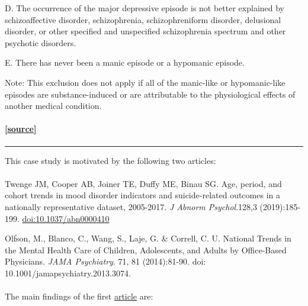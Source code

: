\documentclass[
]{article}
\begin{document}
D. The occurrence of the major depressive episode is not better
explained by schizoaffective disorder, schizophrenia, schizophreniform
disorder, delusional disorder, or other specified and unspecified
schizophrenia spectrum and other psychotic disorders.

E. There has never been a manic episode or a hypomanic episode.

Note: This exclusion does not apply if all of the manic-like or
hypomanic-like episodes are substance-induced or are attributable to the
physiological effects of another medical condition.

\hypertarget{source-2}{%
\paragraph{\texorpdfstring{\href{https://www.icsi.org/guideline/depression/diagnose-and-characterize-major-depression-persistent-depressive-disorder-with-clinical-interview/}{{[}source{]}}}{{[}source{]}}}\label{source-2}}

\begin{center}\rule{0.5\linewidth}{0.5pt}\end{center}

This case study is motivated by the following two articles:

\hypertarget{section-10}{%
\paragraph{}\label{section-10}}

Twenge JM, Cooper AB, Joiner TE, Duffy ME, Binau SG. Age, period, and
cohort trends in mood disorder indicators and suicide-related outcomes
in a nationally representative dataset, 2005-2017. \emph{J Abnorm
Psychol}.128,3 (2019):185-199. \url{doi:10.1037/abn0000410}

Olfson, M., Blanco, C., Wang, S., Laje, G. \& Correll, C. U. National
Trends in the Mental Health Care of Children, Adolescents, and Adults by
Office-Based Physicians. \emph{JAMA Psychiatry}. 71, 81 (2014):81-90.
doi: 10.1001/jamapsychiatry.2013.3074.

\hypertarget{section-11}{%
\paragraph{}\label{section-11}}

The main findings of the first
\href{https://content.apa.org/record/2019-12578-001}{article} are:
\end{document}
